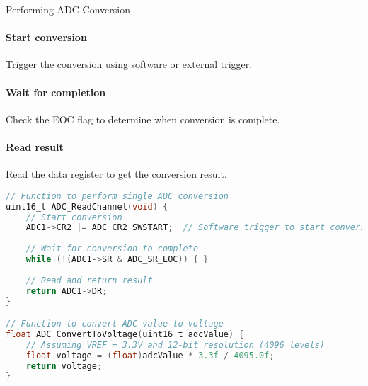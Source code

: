 \begin{KR}{Performing ADC Conversion}
\paragraph{Start conversion}
Trigger the conversion using software or external trigger.
\paragraph{Wait for completion}
Check the EOC flag to determine when conversion is complete.
\paragraph{Read result}
Read the data register to get the conversion result.

\begin{lstlisting}[language=C, style=basesmol]
// Function to perform single ADC conversion
uint16_t ADC_ReadChannel(void) {
    // Start conversion
    ADC1->CR2 |= ADC_CR2_SWSTART;  // Software trigger to start conversion
    
    // Wait for conversion to complete
    while (!(ADC1->SR & ADC_SR_EOC)) { }
    
    // Read and return result
    return ADC1->DR;
}

// Function to convert ADC value to voltage
float ADC_ConvertToVoltage(uint16_t adcValue) {
    // Assuming VREF = 3.3V and 12-bit resolution (4096 levels)
    float voltage = (float)adcValue * 3.3f / 4095.0f;
    return voltage;
}
\end{lstlisting}
\end{KR}

